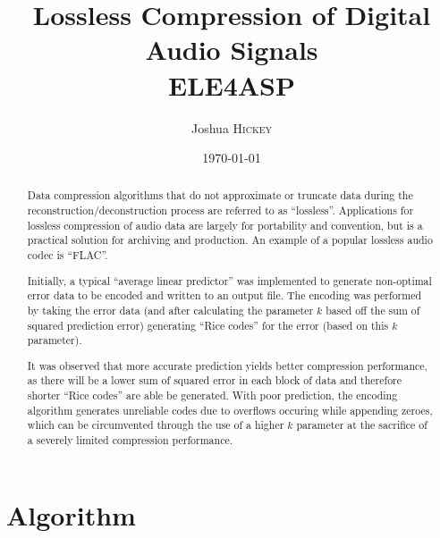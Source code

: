 \documentclass{article}
\title{Lossless Compression of Digital Audio Signals \\ ELE4ASP} %
\author{Joshua \textsc{Hickey}} %
\date{\today} %
\begin{document}
\maketitle %



\begin{abstract}

Data compression algorithms that do not approximate or truncate data during the reconstruction/deconstruction process are referred to as ``lossless''. Applications for lossless compression of audio data are largely for portability and convention, but is a practical solution for archiving and production. An example of a popular lossless audio codec is ``FLAC''.

Initially, a typical ``average linear predictor'' was implemented to generate non-optimal error data to be encoded and written to an output file. The encoding was performed by taking the error data (and after calculating the parameter $k$ based off the sum of squared prediction error) generating ``Rice codes'' for the error (based on this $k$ parameter).

It was observed that more accurate prediction yields better compression performance, as there will be a lower sum of squared error in each block of data and therefore shorter ``Rice codes'' are able be generated. With poor prediction, the encoding algorithm generates unreliable codes due to overflows occuring while appending zeroes, which can be circumvented through the use of a higher $k$ parameter at the sacrifice of a severely limited compression performance.  

\end{abstract}

\section*{Algorithm}




\cite{makhoul1975linear}





\end{document}
